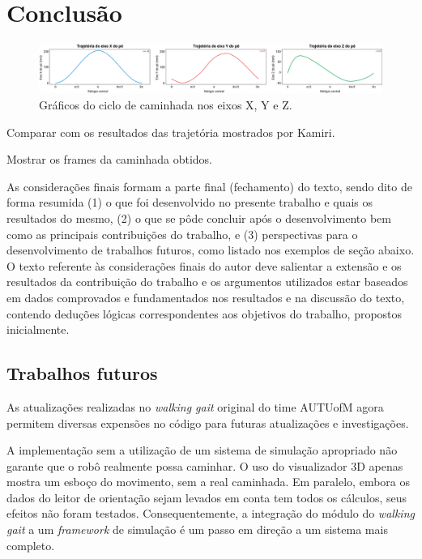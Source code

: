 \chapter{Conclusão}

\begin{figure}[htb]
	\centering
	\includegraphics[width=\textwidth]{imagens/svg/conclusion-trajectories-graph}
	\caption{Gráficos do ciclo de caminhada nos eixos X, Y e Z.}
	\label{fig:conclusion:trajectories:graph}
\end{figure}

\begin{guide}
	Comparar com os resultados das trajetória mostrados por Kamiri.
\end{guide}

\begin{guide}
	Mostrar os frames da caminhada obtidos.
\end{guide}
	
As considerações finais formam a parte final (fechamento) do texto, sendo dito
de forma resumida (1) o que foi desenvolvido no presente trabalho e quais os
resultados do mesmo, (2) o que se pôde concluir após o desenvolvimento bem como
as principais contribuições do trabalho, e (3) perspectivas para o
desenvolvimento de trabalhos futuros, como listado nos exemplos de seção abaixo.
O texto referente às considerações finais do autor deve salientar a extensão e
os resultados da contribuição do trabalho e os argumentos utilizados estar
baseados em dados comprovados e fundamentados nos resultados e na discussão do
texto, contendo deduções lógicas correspondentes aos objetivos do trabalho,
propostos inicialmente.

\section{Trabalhos futuros}

As atualizações realizadas no \textit{walking gait} original do time AUTUofM agora permitem diversas expensões no código para futuras atualizações e investigações.

A implementação sem a utilização de um sistema de simulação apropriado não garante que o robô realmente possa caminhar. O uso do visualizador 3D apenas mostra um esboço do movimento, sem a real caminhada. Em paralelo, embora os dados do leitor de orientação sejam levados em conta tem todos os cálculos, seus efeitos não foram testados. Consequentemente, a integração do módulo do \textit{walking gait} a um \textit{framework} de simulação é um passo em direção a um sistema mais completo.

